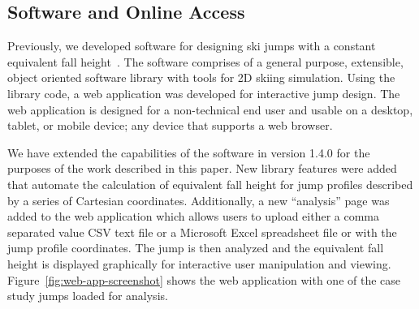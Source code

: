 \documentclass{article}
\begin{document}
\subsection{Software and Online Access}
%
Previously, we developed software for designing ski jumps with a constant
equivalent fall height~\cite{Moore2018}. The software comprises of a general
purpose, extensible, object oriented software library with tools for 2D skiing
simulation. Using the library code, a web application was developed for
interactive jump design. The web application is designed for a non-technical
end user and usable on a desktop, tablet, or mobile device; any device that
supports a web browser.

We have extended the capabilities of the software in version 1.4.0 for the
purposes of the work described in this paper. New library features were added
that automate the calculation of equivalent fall height for jump profiles
described by a series of Cartesian coordinates.
Additionally, a new
``analysis'' page was added to the web application which allows users to upload
either a comma separated value CSV text file or a Microsoft Excel spreadsheet
file or with the jump profile coordinates. The jump is then analyzed and the
equivalent fall height is displayed graphically for interactive user
manipulation and viewing. Figure~\ref{fig:web-app-screenshot} shows the web
application with one of the case study jumps loaded for analysis.
%
\end{document}
